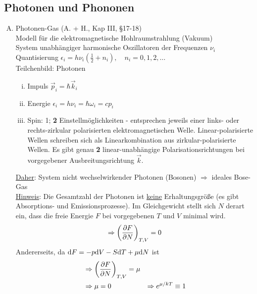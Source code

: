 \subsection{Photonen und Phononen}
\begin{enumerate}[A)]
    \item Photonen-Gas (A. + H., Kap III, §17-18)\\
    Modell für die elektromagnetische Hohlraumstrahlung (Vakuum) \\
    System unabhängiger harmonische Oszillatoren der Frequenzen $\nu_i$ \\
    Quantisierung $\epsilon_i = h \nu_i \left( \frac{1}{2} + n_i \right), \quad n_i = 0, 1, 2, \ldots$ \\
    Teilchenbild: Photonen
    \begin{enumerate}[i)]
        \item Impuls $\vec{p}_i = \hbar \vec{k}_i$
        \item Energie $\epsilon_i = h \nu_i = \hbar \omega_i = c p_i$
        \item Spin: 1; \textbf{2} Einstellmöglichkeiten - entsprechen jeweils einer links- oder rechts-zir\-ku\-lar polarisierten elektromagnetischen Welle.
        Linear-polarisierte Wellen schreiben sich als Linearkombination aus zirkular-polarisierte Wellen. Es gibt genau \textbf{2} linear-unabhängige 
        Polarisationsrichtungen bei vorgegebener Ausbreitungsrichtung $\vec{k}$.
    \end{enumerate}
    \underline{Daher}: System nicht wechselwirkender Photonen (Bosonen) $\Rightarrow$ ideales Bo\-se-Gas\\
    \underline{Hinweis}: Die Gesamtzahl der Photonen ist \underline{keine} Erhaltungsgröße (es gibt Ab\-sorp\-tions- und Emissionsprozesse).
    Im Gleichgewicht stellt sich $N$ derart ein, dass die freie Energie $F$ bei vorgegebenen $T$ und $V$ minimal wird.
    \begin{equation}
        \Rightarrow \left( \frac{\partial F}{\partial N} \right)_{T, V} = 0
    \end{equation}
    Andererseits, da $\mathrm{d} F = - p \mathrm{d} V - S \mathrm{d} T + \mu \mathrm{d} N$ ist
    \begin{equation}
        \begin{split}
            & \Rightarrow \left( \frac{\partial F}{\partial N} \right)_{T, V} = \mu \\
            & \Rightarrow \mu = 0
            & \Rightarrow e^{\mu / k T} \equiv 1
        \end{split}
    \end{equation}

\end{enumerate}
